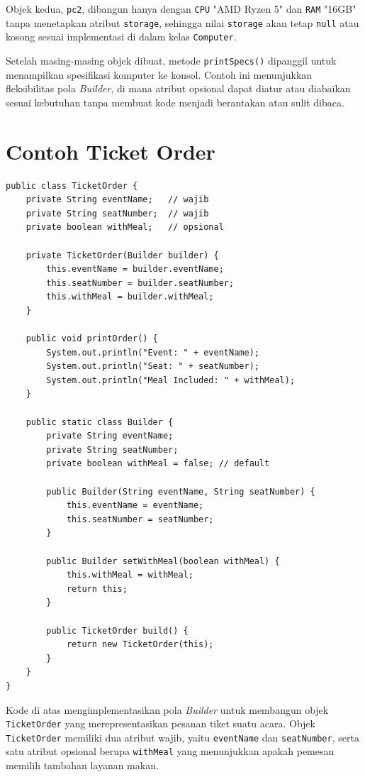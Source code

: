 Objek kedua, \texttt{pc2}, dibangun hanya dengan \texttt{CPU} "AMD Ryzen 5" dan \texttt{RAM} "16GB" tanpa menetapkan atribut \texttt{storage}, sehingga nilai \texttt{storage} akan tetap \texttt{null} atau kosong sesuai implementasi di dalam kelas \texttt{Computer}.

Setelah masing-masing objek dibuat, metode \texttt{printSpecs()} dipanggil untuk menampilkan spesifikasi komputer ke konsol. Contoh ini menunjukkan fleksibilitas pola \textit{Builder}, di mana atribut opsional dapat diatur atau diabaikan sesuai kebutuhan tanpa membuat kode menjadi berantakan atau sulit dibaca.


\section{Contoh Ticket Order}

\begin{lstlisting}[style=JavaStyle, caption={Implementasi Builder pada Kelas TicketOrder}, label={lst:builder-ticket}]
public class TicketOrder {
	private String eventName;   // wajib
	private String seatNumber;  // wajib
	private boolean withMeal;   // opsional
	
	private TicketOrder(Builder builder) {
		this.eventName = builder.eventName;
		this.seatNumber = builder.seatNumber;
		this.withMeal = builder.withMeal;
	}
	
	public void printOrder() {
		System.out.println("Event: " + eventName);
		System.out.println("Seat: " + seatNumber);
		System.out.println("Meal Included: " + withMeal);
	}
	
	public static class Builder {
		private String eventName;
		private String seatNumber;
		private boolean withMeal = false; // default
		
		public Builder(String eventName, String seatNumber) {
			this.eventName = eventName;
			this.seatNumber = seatNumber;
		}
		
		public Builder setWithMeal(boolean withMeal) {
			this.withMeal = withMeal;
			return this;
		}
		
		public TicketOrder build() {
			return new TicketOrder(this);
		}
	}
}
\end{lstlisting}

Kode di atas mengimplementasikan pola \textit{Builder} untuk membangun objek \texttt{TicketOrder} yang merepresentasikan pesanan tiket suatu acara. Objek \texttt{TicketOrder} memiliki dua atribut wajib, yaitu \texttt{eventName} dan \texttt{seatNumber}, serta satu atribut opsional berupa \texttt{withMeal} yang menunjukkan apakah pemesan memilih tambahan layanan makan.

